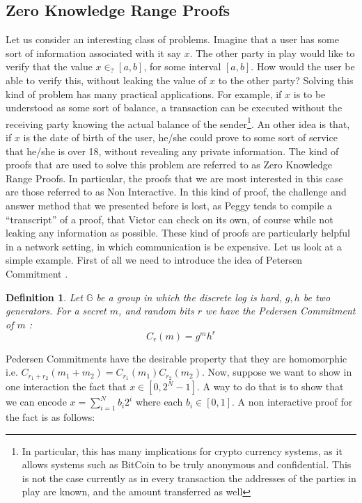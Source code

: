 \documentclass{article}
\newtheorem{definition}{Definition}
\begin{document}
\subsection{Zero Knowledge Range Proofs}
\label{zkrp}
Let us consider an interesting class of problems. Imagine that a user has some sort of information associated
with it say $x$. The other party in play would like to verify that the value $x \in_? [a, b]$, for some
interval $[a, b]$. How would the user be able to verify this, without leaking the value of $x$ to the
other party? Solving this kind of problem has many practical applications. For example, if $x$ is to be
understood as some sort of balance, a transaction can be executed without the receiving party knowing the
actual balance of the sender\footnote{In particular, this has many implications for crypto currency systems,
    as it allows systems such as BitCoin to be truly anonymous and confidential. This is not the case currently
    as in every transaction the addresses of the parties in play are known, and the amount transferred as well}.
An other idea is that, if $x$ is the date of birth of the user, he/she could
prove to some sort of service that he/she is over 18, without revealing any private information. The kind
of proofs that are used to solve this problem are referred to as Zero Knowledge Range Proofs. In particular,
the proofs that we are most interested in this case are those referred to as Non Interactive. In this kind
of proof, the challenge and answer method that we presented before is lost, as Peggy tends to
compile a \enquote{transcript} of a proof, that Victor can check on its own, of course while not leaking any information
as possible. These kind of proofs are particularly helpful in a network setting, in which communication is
be expensive. Let us look at a simple example. First of all we need to introduce the idea of Petersen Commitment \cite{pedersenNonInteractiveInformationTheoreticSecure1992}.
\begin{definition}
    Let $\mathbb{G}$ be a group in which the discrete log is hard, $g, h$ be two generators.
    For a secret $m$, and random bits $r$ we have the Pedersen Commitment of $m$ :
    \[ C_r(m) = g^m h^r \]
\end{definition}
Pedersen Commitments have the desirable property that they are homomorphic i.e. $C_{r_1 + r_2}(m_1 + m_2) = C_{r_1}(m_1) C_{r_2}(m_2)$.
Now, suppose we want to show in one interaction the fact that $x \in [0, 2^N -1]$. A way to do that is to show
that we can encode $x =\sum^N_{i=1} b_i 2^i$ where each $b_i \in [0, 1]$. A non interactive proof \cite{maoGuaranteedCorrectSharing1998b} for the fact is as follows:
\end{document}
